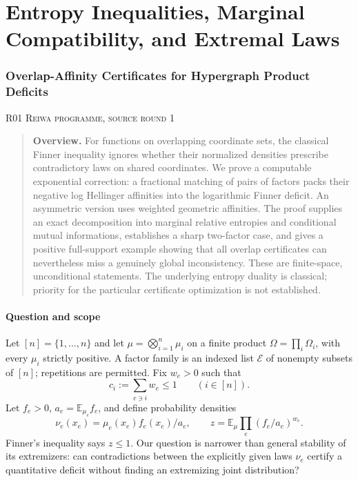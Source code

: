 \documentclass[11pt,a4paper]{article}
\theoremstyle{definition}\newtheorem{definition}[theorem]{Definition}
\theoremstyle{remark}\newtheorem{remark}[theorem]{Remark}
\newcommand{\E}{\mathbb E}\newcommand{\one}{\mathbf 1}\newcommand{\1}{\mathbf 1}
\numberwithin{equation}{section}
\begin{document}
\clearpage
\part{Entropy Inequalities, Marginal Compatibility, and Extremal Laws}


\clearpage
\section[R01 --- Overlap-Affinity Certificates for Hypergraph Product Deficits]{Overlap-Affinity Certificates for Hypergraph Product Deficits}\label{contrib-R01}
\noindent\textsc{R01 \quad Reiwa programme, source round 1}\par\medskip


\begin{quote}\small\textbf{Overview.} For functions on overlapping coordinate sets, the classical Finner inequality ignores whether their normalized densities prescribe contradictory laws on shared coordinates. We prove a computable exponential correction: a fractional matching of pairs of factors packs their negative log Hellinger affinities into the logarithmic Finner deficit. An asymmetric version uses weighted geometric affinities. The proof supplies an exact decomposition into marginal relative entropies and conditional mutual informations, establishes a sharp two-factor case, and gives a positive full-support example showing that all overlap certificates can nevertheless miss a genuinely global inconsistency. These are finite-space, unconditional statements. The underlying entropy duality is classical; priority for the particular certificate optimization is not established.\end{quote}

\subsection{Question and scope}\label{R01-sec-1}
Let $[n]=\{1,\ldots,n\}$ and let $\mu=\bigotimes_{i=1}^n\mu_i$ on a finite product $\Omega=\prod_i\Omega_i$, with every $\mu_i$ strictly positive. A factor family is an indexed list $\mathcal E$ of nonempty subsets of $[n]$; repetitions are permitted. Fix $w_e>0$ such that
\begin{equation}\label{R01-cover}c_i:=\sum_{e\ni i}w_e\leq1\qquad(i\in[n]).\end{equation}
Let $f_e>0$, $a_e=\E_{\mu_e}f_e$, and define probability densities
\[
\nu_e(x_e)=\mu_e(x_e)f_e(x_e)/a_e,\qquad
z=\E_\mu\prod_e(f_e/a_e)^{w_e}.
\]
Finner's inequality says $z\leq1$. Our question is narrower than general stability of its extremizers: can contradictions between the explicitly given laws $\nu_e$ certify a quantitative deficit without finding an extremizing joint distribution?
\end{document}
